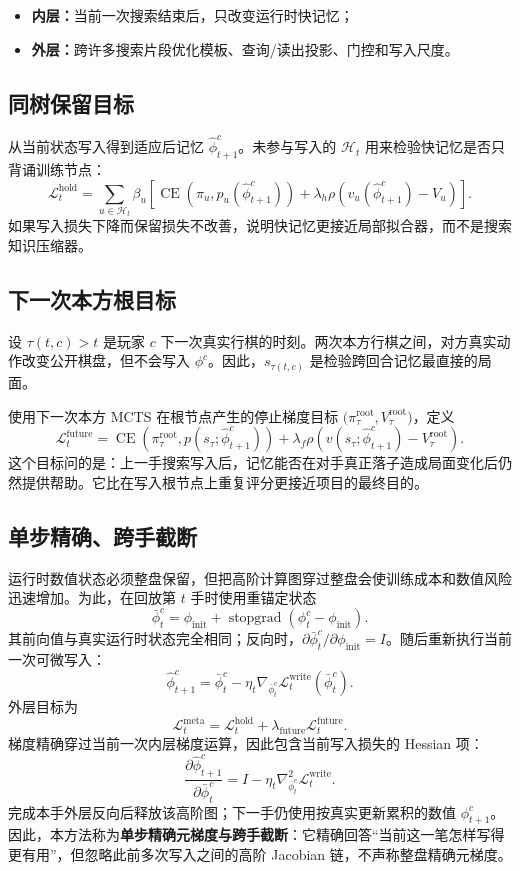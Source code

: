 \documentclass[UTF8,11pt,a4paper]{ctexart}
\newcommand{\memoryinit}{\phi_{\mathrm{init}}}
\newcommand{\stopgrad}{\operatorname{stopgrad}}
\newcommand{\CE}{\operatorname{CE}}
\begin{document}
\begin{itemize}
  \item \textbf{内层：}当前一次搜索结束后，只改变运行时快记忆；
  \item \textbf{外层：}跨许多搜索片段优化模板、查询/读出投影、门控和写入尺度。
\end{itemize}

\subsection{同树保留目标}

从当前状态写入得到适应后记忆 $\widehat\phi^c_{t+1}$。未参与写入的 $\mathcal H_t$ 用来检验快记忆是否只背诵训练节点：
\[
  \mathcal L_t^{\mathrm{hold}}
  =\sum_{u\in\mathcal H_t}\beta_u
   \left[
    \CE\!\left(\pi_u,p_u(\widehat\phi^c_{t+1})\right)
    +\lambda_h\rho\!\left(v_u(\widehat\phi^c_{t+1})-V_u\right)
   \right].
\]
如果写入损失下降而保留损失不改善，说明快记忆更接近局部拟合器，而不是搜索知识压缩器。

\subsection{下一次本方根目标}

设 $\tau(t,c)>t$ 是玩家 $c$ 下一次真实行棋的时刻。两次本方行棋之间，对方真实动作改变公开棋盘，但不会写入 $\phi^c$。因此，$s_{\tau(t,c)}$ 是检验跨回合记忆最直接的局面。

使用下一次本方 MCTS 在根节点产生的停止梯度目标
$\bigl(\pi^{\mathrm{root}}_{\tau},V^{\mathrm{root}}_{\tau}\bigr)$，定义
\[
  \mathcal L_t^{\mathrm{future}}
  =\CE\!\left(
      \pi^{\mathrm{root}}_{\tau},
      p\!\left(s_{\tau};\widehat\phi^c_{t+1}\right)
    \right)
   +\lambda_f\rho\!\left(
      v\!\left(s_{\tau};\widehat\phi^c_{t+1}\right)
      -V^{\mathrm{root}}_{\tau}
    \right).
\]
这个目标问的是：上一手搜索写入后，记忆能否在对手真正落子造成局面变化后仍然提供帮助。它比在写入根节点上重复评分更接近项目的最终目的。

\subsection{单步精确、跨手截断}

运行时数值状态必须整盘保留，但把高阶计算图穿过整盘会使训练成本和数值风险迅速增加。为此，在回放第 $t$ 手时使用重锚定状态
\[
  \bar\phi^c_t
  =\memoryinit+\stopgrad\!\left(\phi^c_t-\memoryinit\right).
\]
其前向值与真实运行时状态完全相同；反向时，$\partial\bar\phi^c_t/\partial\memoryinit=I$。随后重新执行当前一次可微写入：
\[
  \widehat\phi^c_{t+1}
  =\bar\phi^c_t-\eta_t
    \nabla_{\bar\phi^c_t}
       \mathcal L_t^{\mathrm{write}}(\bar\phi^c_t).
\]
外层目标为
\[
  \mathcal L_t^{\mathrm{meta}}
  =\mathcal L_t^{\mathrm{hold}}
   +\lambda_{\mathrm{future}}\mathcal L_t^{\mathrm{future}}.
\]
梯度精确穿过当前一次内层梯度运算，因此包含当前写入损失的 Hessian 项：
\[
  \frac{\partial\widehat\phi^c_{t+1}}{\partial\bar\phi^c_t}
  =I-\eta_t\nabla^2_{\bar\phi^c_t}
      \mathcal L_t^{\mathrm{write}}.
\]
完成本手外层反向后释放该高阶图；下一手仍使用按真实更新累积的数值 $\phi^c_{t+1}$。因此，本方法称为\textbf{单步精确元梯度与跨手截断}：它精确回答“当前这一笔怎样写得更有用”，但忽略此前多次写入之间的高阶 Jacobian 链，不声称整盘精确元梯度。
\end{document}
